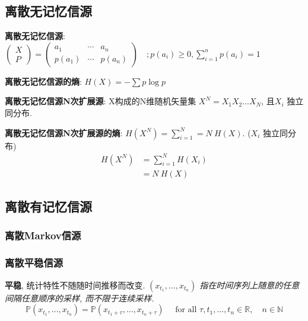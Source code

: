 \documentclass{article}
\newcommand{\env}[2]{\begin{#1}#2\end{#1}}
\newcommand{\defi}[2]{\textbf{#1}, #2}
\begin{document}
    \subsection{离散无记忆信源}
        \textbf{离散无记忆信源}:  $ \left(\begin{array}{l} X \\ P \end{array}\right)
                 = \left(\begin{array}{lll}
                    a_{1} & \cdots & a_{n} \\ p\left(a_{1}\right) & \cdots & p\left(a_{n}\right)
                \end{array}\right) \quad;
                p\left(a_{i}\right) \geqslant 0, \sum_{i=1}^{n} p\left(a_{i}\right)=1$
                
            
        \textbf{离散无记忆信源的熵}: $H(X) = -\sum p \log p$
        
        \textbf{离散无记忆信源N次扩展源}: X构成的N维随机矢量集 $X^N = X_1 X_2...X_N$, 且$X_i$ 独立同分布.

        \textbf{离散无记忆信源N次扩展源的熵}: $H(X^N) = \sum_{i=1}^N = N\ H(X)$. ($X_i$ 独立同分布)
            \env{align*}{
                H(X^N) 
                &= \sum_{i=1}^N H(X_i)  \tag{$X_i$ 独立}\\
                &= N\ H(X)  \tag{$X_i$ 同分布}
            }
        
    \subsection{离散有记忆信源}
    
        \subsubsection{离散Markov信源}
        
        \subsubsection{离散平稳信源}
            
            \defi{平稳}{统计特性不随随时间推移而改变. \textit{$\left(x_{t_{1}}, \ldots, x_{t_{n}}\right)$ 指在时间序列上随意的任意间隔任意顺序的采样, 而不限于连续采样.}
                $$ \mathbb P\left(x_{t_{1}}, \ldots, x_{t_{n}}\right) = \mathbb P\left(x_{t_{1}+\tau}, \ldots, x_{t_{n}+\tau}\right) \quad \text { for all } \tau, t_{1}, \ldots, t_{n} \in \mathbb{R}, \quad n \in \mathbb{N}$$
            }
                
\end{document}
